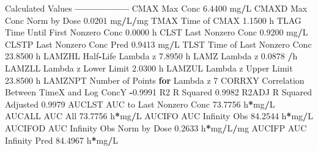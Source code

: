 \documentclass[12pt,]{krantz}
\newenvironment{Shaded}{\begin{snugshade}}{\end{snugshade}}
\newcommand{\DecValTok}[1]{\textcolor[rgb]{0.00,0.00,0.81}{#1}}
\newcommand{\FloatTok}[1]{\textcolor[rgb]{0.00,0.00,0.81}{#1}}
\newcommand{\ControlFlowTok}[1]{\textcolor[rgb]{0.13,0.29,0.53}{\textbf{#1}}}
\newcommand{\OperatorTok}[1]{\textcolor[rgb]{0.81,0.36,0.00}{\textbf{#1}}}
\newcommand{\NormalTok}[1]{#1}
\theoremstyle{definition}
\theoremstyle{definition}
\theoremstyle{definition}
\theoremstyle{remark}
\begin{document}
\begin{Shaded}
\begin{Highlighting}[]
\NormalTok{Calculated Values}
\OperatorTok{-----------------}
\NormalTok{CMAX       Max Conc                                        }\FloatTok{6.4400}\NormalTok{ mg}\OperatorTok{/}\NormalTok{L}
\NormalTok{CMAXD      Max Conc Norm by Dose                           }\FloatTok{0.0201}\NormalTok{ mg}\OperatorTok{/}\NormalTok{L}\OperatorTok{/}\NormalTok{mg}
\NormalTok{TMAX       Time of CMAX                                    }\FloatTok{1.1500}\NormalTok{ h}
\NormalTok{TLAG       Time Until First Nonzero Conc                   }\FloatTok{0.0000}\NormalTok{ h}
\NormalTok{CLST       Last Nonzero Conc                               }\FloatTok{0.9200}\NormalTok{ mg}\OperatorTok{/}\NormalTok{L}
\NormalTok{CLSTP      Last Nonzero Conc Pred                          }\FloatTok{0.9413}\NormalTok{ mg}\OperatorTok{/}\NormalTok{L}
\NormalTok{TLST       Time of Last Nonzero Conc                      }\FloatTok{23.8500}\NormalTok{ h}
\NormalTok{LAMZHL     Half}\OperatorTok{-}\NormalTok{Life Lambda z                              }\FloatTok{7.8950}\NormalTok{ h}
\NormalTok{LAMZ       Lambda z                                        }\FloatTok{0.0878} \OperatorTok{/}\NormalTok{h}
\NormalTok{LAMZLL     Lambda z Lower Limit                            }\FloatTok{2.0300}\NormalTok{ h}
\NormalTok{LAMZUL     Lambda z Upper Limit                           }\FloatTok{23.8500}\NormalTok{ h}
\NormalTok{LAMZNPT    Number of Points }\ControlFlowTok{for}\NormalTok{ Lambda z                   }\DecValTok{7}
\NormalTok{CORRXY     Correlation Between TimeX and Log ConcY        }\OperatorTok{-}\FloatTok{0.9991} 
\NormalTok{R2         R Squared                                       }\FloatTok{0.9982} 
\NormalTok{R2ADJ      R Squared Adjusted                              }\FloatTok{0.9979} 
\NormalTok{AUCLST     AUC to Last Nonzero Conc                       }\FloatTok{73.7756}\NormalTok{ h}\OperatorTok{*}\NormalTok{mg}\OperatorTok{/}\NormalTok{L}
\NormalTok{AUCALL     AUC All                                        }\FloatTok{73.7756}\NormalTok{ h}\OperatorTok{*}\NormalTok{mg}\OperatorTok{/}\NormalTok{L}
\NormalTok{AUCIFO     AUC Infinity Obs                               }\FloatTok{84.2544}\NormalTok{ h}\OperatorTok{*}\NormalTok{mg}\OperatorTok{/}\NormalTok{L}
\NormalTok{AUCIFOD    AUC Infinity Obs Norm by Dose                   }\FloatTok{0.2633}\NormalTok{ h}\OperatorTok{*}\NormalTok{mg}\OperatorTok{/}\NormalTok{L}\OperatorTok{/}\NormalTok{mg}
\NormalTok{AUCIFP     AUC Infinity Pred                              }\FloatTok{84.4967}\NormalTok{ h}\OperatorTok{*}\NormalTok{mg}\OperatorTok{/}\NormalTok{L}

\end{Highlighting}
\end{Shaded}
\end{document}
